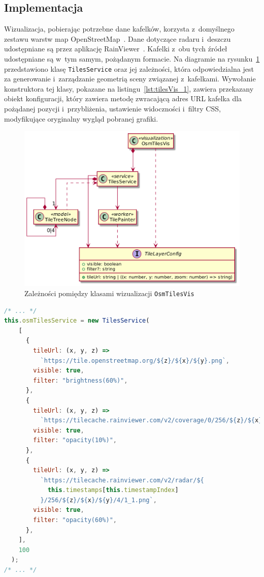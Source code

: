 \subsection{Implementacja}

Wizualizacja, pobierając potrzebne dane kafelków, korzysta z~domyślnego zestawu warstw map OpenStreetMap~\cite{OSM}. Dane dotyczące radaru i~deszczu udostępniane są przez aplikację RainViewer~\cite{RainViewer}. Kafelki z~obu tych źródeł udostępniane są w~tym samym, pożądanym formacie. Na diagramie na rysunku~\ref{fig:c4_tiles} przedstawiono klasę \texttt{TilesService} oraz jej zależności, która odpowiedzialna jest za generowanie i~zarządzanie geometrią sceny związanej z~kafelkami. Wywołanie konstruktora tej klasy, pokazane na listingu~\ref{lst:tilesVis_1}, zawiera przekazany obiekt konfiguracji, który zawiera metodę zwracającą adres URL kafelka dla pożądanej pozycji i~przybliżenia, ustawienie widoczności i~filtry CSS, modyfikujące oryginalny wygląd pobranej grafiki.

\begin{figure}[h]
  \centering
  \includegraphics[scale=0.35]{diagrams/out/c4_tiles.png}
  \caption{Zależności pomiędzy klasami wizualizacji \texttt{OsmTilesVis}}
  \label{fig:c4_tiles} 
\end{figure}

\begin{lstlisting}[float=h, language=javascript, label={lst:tilesVis_1}, caption={
  Fragmenty klasy \texttt{OsmTilesVis}}
]
/* ... */
this.osmTilesService = new TilesService(
    [
      {
        tileUrl: (x, y, z) =>
          `https://tile.openstreetmap.org/${z}/${x}/${y}.png`,
        visible: true,
        filter: "brightness(60%)",
      },
      {
        tileUrl: (x, y, z) =>
          `https://tilecache.rainviewer.com/v2/coverage/0/256/${z}/${x}/${y}.png`,
        visible: true,
        filter: "opacity(10%)",
      },
      {
        tileUrl: (x, y, z) =>
          `https://tilecache.rainviewer.com/v2/radar/${
            this.timestamps[this.timestampIndex]
          }/256/${z}/${x}/${y}/4/1_1.png`,
        visible: true,
        filter: "opacity(60%)",
      },
    ],
    100
  );
/* ... */
\end{lstlisting}

